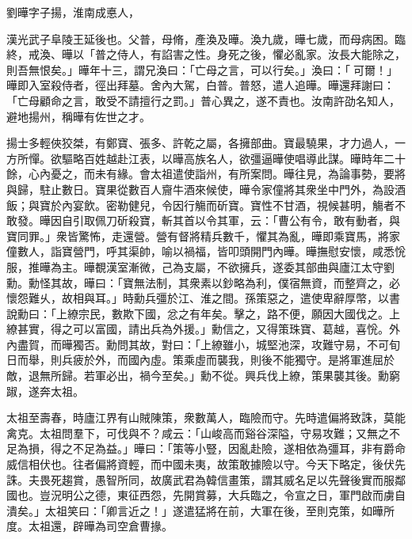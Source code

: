 \begin{pinyinscope}
 
 
 劉曄字子揚，淮南成悳人，
 
 
 漢光武子阜陵王延後也。父普，母脩，產渙及曄。渙九歲，曄七歲，而母病困。臨終，戒渙、曄以「普之侍人，有諂害之性。身死之後，懼必亂家。汝長大能除之，則吾無恨矣。」曄年十三，謂兄渙曰：「亡母之言，可以行矣。」渙曰：「𨚗可爾！」曄即入室殺侍者，徑出拜墓。舍內大駕，白普。普怒，遣人追曄。曄還拜謝曰：「亡母顧命之言，敢受不請擅行之罰。」普心異之，遂不責也。汝南許劭名知人，避地揚州，稱曄有佐世之才。
 
 
 
 
 揚士多輕俠狡桀，有鄭寶、張多、許乾之屬，各擁部曲。寶最驍果，才力過人，一方所憚。欲驅略百姓越赴江表，以曄高族名人，欲彊逼曄使唱導此謀。曄時年二十餘，心內憂之，而未有緣。會太祖遣使詣州，有所案問。曄往見，為論事勢，要將與歸，駐止數日。寶果從數百人齎牛酒來候使，曄令家僮將其衆坐中門外，為設酒飯；與寶於內宴飲。密勒健兒，令因行觴而斫寶。寶性不甘酒，視候甚明，觴者不敢發。曄因自引取佩刀斫殺寶，斬其首以令其軍，云：「曹公有令，敢有動者，與寶同罪。」衆皆驚怖，走還營。營有督將精兵數千，懼其為亂，曄即乘寶馬，將家僮數人，詣寶營門，呼其渠帥，喻以禍福，皆叩頭開門內曄。曄撫慰安懷，咸悉恱服，推曄為主。曄覩漢室漸微，己為支屬，不欲擁兵，遂委其部曲與廬江太守劉勳。勳怪其故，曄曰：「寶無法制，其衆素以鈔略為利，僕宿無資，而整齊之，必懷怨難乆，故相與耳。」時勳兵彊於江、淮之間。孫策惡之，遣使卑辭厚幣，以書說勳曰：「上繚宗民，數欺下國，忿之有年矣。擊之，路不便，願因大國伐之。上繚甚實，得之可以富國，請出兵為外援。」勳信之，又得策珠寶、葛越，喜恱。外內盡賀，而曄獨否。勳問其故，對曰：「上繚雖小，城堅池深，攻難守易，不可旬日而舉，則兵疲於外，而國內虛。策乘虛而襲我，則後不能獨守。是將軍進屈於敵，退無所歸。若軍必出，禍今至矣。」勳不從。興兵伐上繚，策果襲其後。勳窮踧，遂奔太祖。
 
 
太祖至壽春，時廬江界有山賊陳策，衆數萬人，臨險而守。先時遣偏將致誅，莫能禽克。太祖問羣下，可伐與不？咸云：「山峻高而谿谷深隘，守易攻難；又無之不足為損，得之不足為益。」曄曰：「策等小豎，因亂赴險，遂相依為彊耳，非有爵命威信相伏也。往者偏將資輕，而中國未夷，故策敢據險以守。今天下略定，後伏先誅。夫畏死趨賞，愚智所同，故廣武君為韓信畫策，謂其威名足以先聲後實而服鄰國也。豈況明公之德，東征西怨，先開賞募，大兵臨之，令宣之日，軍門啟而虜自潰矣。」太祖笑曰：「卿言近之！」遂遣猛將在前，大軍在後，至則克策，如曄所度。太祖還，辟曄為司空倉曹掾。
 

\end{pinyinscope}
